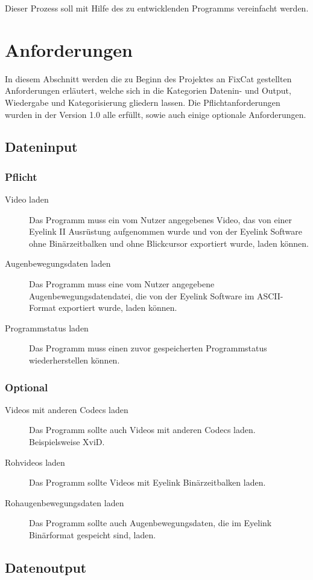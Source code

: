 \documentclass[a4paper,draft]{scrartcl}
\begin{document}
Dieser Prozess soll mit Hilfe des zu entwicklenden Programms vereinfacht werden.

\section{Anforderungen}
In diesem Abschnitt werden die zu Beginn des Projektes an FixCat gestellten Anforderungen erläutert, welche sich in die Kategorien Datenin- und Output, Wiedergabe und Kategorisierung gliedern lassen. 
Die Pflichtanforderungen wurden in der Version 1.0 alle erfüllt, sowie auch einige optionale Anforderungen. 
\subsection{Dateninput}
\subsubsection{Pflicht}
\begin{description}
\item[Video laden] Das Programm muss ein vom Nutzer angegebenes Video, das von einer Eyelink II Ausrüstung aufgenommen wurde und von der Eyelink Software ohne Binärzeitbalken und ohne Blickcursor exportiert wurde, laden können.
\item[Augenbewegungsdaten laden] Das Programm muss eine vom Nutzer angegebene Augenbewegungsdatendatei, die von der Eyelink Software im ASCII-Format exportiert wurde, laden können.
\item[Programmstatus laden] Das Programm muss einen zuvor gespeicherten Programmstatus wiederherstellen können.
\end{description}
\subsubsection{Optional}
\begin{description}
\item[Videos mit anderen Codecs laden] Das Programm sollte auch Videos mit anderen Codecs laden. Beispielsweise XviD.
\item[Rohvideos laden] Das Programm sollte Videos mit Eyelink Binärzeitbalken laden.
\item[Rohaugenbewegungsdaten laden] Das Programm sollte auch Augenbewegungsdaten, die im Eyelink Binärformat gespeicht sind, laden.
\end{description}
\subsection{Datenoutput}
\end{document}
